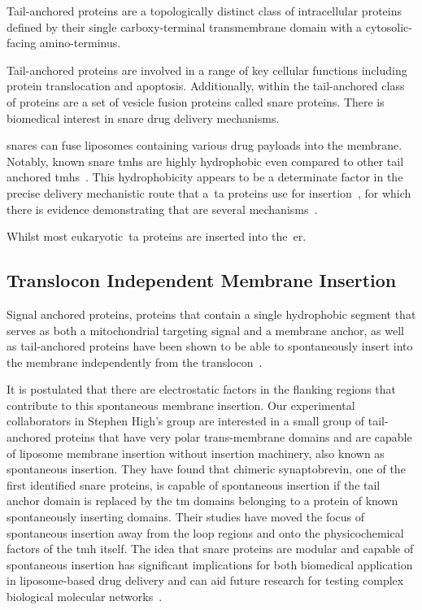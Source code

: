 Tail-anchored proteins are a topologically distinct class of intracellular proteins defined by their single carboxy-terminal transmembrane domain with a cytosolic-facing amino-terminus.

Tail-anchored proteins are involved in a range of key cellular functions including protein translocation and apoptosis.
Additionally, within the tail-anchored class of proteins are a set of vesicle fusion proteins called \gls{snare} proteins.
There is biomedical interest in \gls{snare} drug delivery mechanisms.

\gls{snare}s can fuse liposomes containing various drug payloads into the membrane.
Notably, known \gls{snare} \gls{tmh}s are highly hydrophobic even compared to other tail anchored \gls{tmh}s~\cite{Kalbfleisch2007}.
This hydrophobicity appears to be a determinate factor in the precise delivery mechanistic route that a~\gls{ta} proteins use for insertion~\cite{Rabu2008, Rabu2009}, for which there is evidence demonstrating that are several mechanisms~\cite{Rabu2009, Johnson2013}.

Whilst most eukaryotic~\gls{ta} proteins are inserted into the~\gls{er}.

\subsection{Translocon Independent Membrane Insertion}
Signal anchored proteins, proteins that contain a single hydrophobic segment that serves as both a mitochondrial targeting signal and a membrane anchor, as well as tail-anchored proteins have been shown to be able to spontaneously insert into the membrane independently from the translocon~\cite{Elisa2012, Lan2000, Colombo2009}.

It is postulated that there are electrostatic factors in the flanking regions that contribute to this spontaneous membrane insertion.
Our experimental collaborators in Stephen High’s group are interested in a small group of tail-anchored proteins that have very polar trans-membrane domains and are capable of liposome membrane insertion without insertion machinery, also known as spontaneous insertion.
They have found that chimeric synaptobrevin, one of the first identified \gls{snare} proteins, is capable of spontaneous insertion if the tail anchor domain is replaced by the \gls{tm} domains belonging to a protein of known spontaneously inserting domains.
Their studies have moved the focus of spontaneous insertion away from the loop regions and onto the physicochemical factors of the \gls{tmh} itself.
The idea that \gls{snare} proteins are modular and capable of spontaneous insertion has significant implications for both biomedical application in liposome-based drug delivery and can aid future research for testing complex biological molecular networks~\cite{Allen2013, Nordlund2014}.



